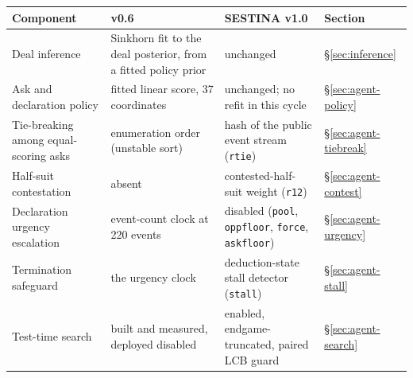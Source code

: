 \begin{tabularx}{\linewidth}{@{}Q{0.77} Q{0.92} Q{1.31} l@{}}
\toprule
Component & v0.6 & SESTINA v1.0 & Section \\
\midrule
Deal inference & Sinkhorn fit to the deal posterior, from a fitted policy prior & unchanged & \S\ref{sec:inference} \\
Ask and declaration policy & fitted linear score, 37 coordinates & unchanged; no refit in this cycle & \S\ref{sec:agent-policy} \\
Tie-breaking among equal-scoring asks & enumeration order (unstable sort) & hash of the public event stream (\texttt{rtie}) & \S\ref{sec:agent-tiebreak} \\
Half-suit contestation & absent & contested-half-suit weight (\texttt{r12}) & \S\ref{sec:agent-contest} \\
Declaration urgency escalation & event-count clock at 220 events & disabled (\texttt{pool}, \texttt{oppfloor}, \texttt{force}, \texttt{askfloor}) & \S\ref{sec:agent-urgency} \\
Termination safeguard & the urgency clock & deduction-state stall detector (\texttt{stall}) & \S\ref{sec:agent-stall} \\
Test-time search & built and measured, deployed disabled & enabled, endgame-truncated, paired LCB guard & \S\ref{sec:agent-search} \\
\bottomrule
\end{tabularx}
